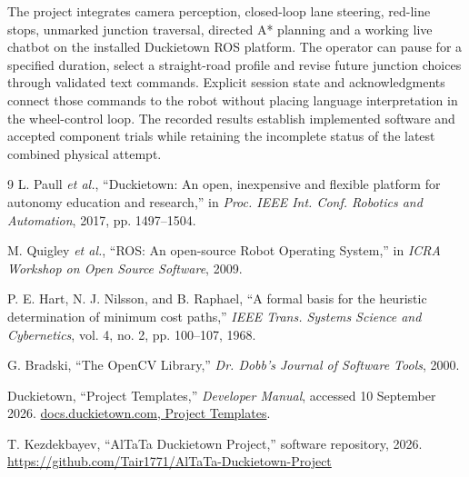 \documentclass[10pt,a4paper,twocolumn]{article}
\begin{document}
The project integrates camera perception, closed-loop lane steering, red-line
stops, unmarked junction traversal, directed A* planning and a working live
chatbot on the installed Duckietown ROS platform. The operator can pause for a
specified duration, select a straight-road profile and revise future junction
choices through validated text commands. Explicit session state and acknowledgments
connect those commands to the robot without placing language interpretation in
the wheel-control loop. The recorded results establish implemented software and
accepted component trials while retaining the incomplete status of the latest
combined physical attempt.

\begin{thebibliography}{9}
L. Paull \emph{et al.}, ``Duckietown: An open, inexpensive and flexible platform
for autonomy education and research,'' in \emph{Proc. IEEE Int. Conf. Robotics
and Automation}, 2017, pp. 1497--1504.

M. Quigley \emph{et al.}, ``ROS: An open-source Robot Operating System,'' in
\emph{ICRA Workshop on Open Source Software}, 2009.

P. E. Hart, N. J. Nilsson, and B. Raphael, ``A formal basis for the heuristic
determination of minimum cost paths,'' \emph{IEEE Trans. Systems Science and
Cybernetics}, vol. 4, no. 2, pp. 100--107, 1968.

G. Bradski, ``The OpenCV Library,'' \emph{Dr. Dobb's Journal of Software Tools},
2000.

Duckietown, ``Project Templates,'' \emph{Developer Manual}, accessed
10 September 2026.
\href{https://docs.duckietown.com/ente/devmanual-software/beginner/dtproject/templates.html}{docs.duckietown.com, Project Templates}.

T. Kezdekbayev, ``AlTaTa Duckietown Project,'' software repository, 2026.
\url{https://github.com/Tair1771/AlTaTa-Duckietown-Project}
\end{thebibliography}
\end{document}
